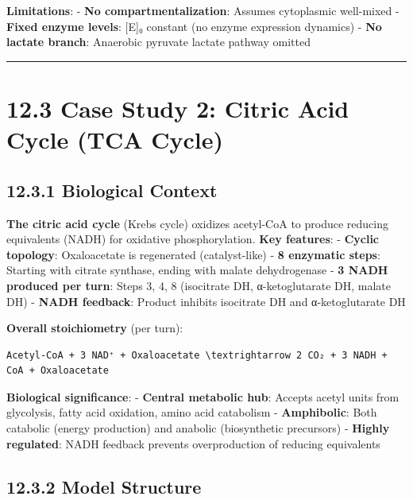 \textbf{Limitations}: - \textbf{No compartmentalization}: Assumes
cytoplasmic well-mixed - \textbf{Fixed enzyme levels}: {[}E{]}₀ constant
(no enzyme expression dynamics) - \textbf{No lactate branch}: Anaerobic
pyruvate \textrightarrow lactate pathway omitted

\begin{center}\rule{0.5\linewidth}{0.5pt}\end{center}

\hypertarget{case-study-2-citric-acid-cycle-tca-cycle}{%
\section{12.3 Case Study 2: Citric Acid Cycle (TCA
Cycle)}\label{case-study-2-citric-acid-cycle-tca-cycle}}

\hypertarget{biological-context-1}{%
\subsection{12.3.1 Biological Context}\label{biological-context-1}}

\textbf{The citric acid cycle} (Krebs cycle) oxidizes acetyl-CoA to
produce reducing equivalents (NADH) for oxidative phosphorylation.
\textbf{Key features}: - \textbf{Cyclic topology}: Oxaloacetate is
regenerated (catalyst-like) - \textbf{8 enzymatic steps}: Starting with
citrate synthase, ending with malate dehydrogenase - \textbf{3 NADH
produced per turn}: Steps 3, 4, 8 (isocitrate DH, α-ketoglutarate DH,
malate DH) - \textbf{NADH feedback}: Product inhibits isocitrate DH and
α-ketoglutarate DH

\textbf{Overall stoichiometry} (per turn):

\begin{lstlisting}
Acetyl-CoA + 3 NAD⁺ + Oxaloacetate \textrightarrow 2 CO₂ + 3 NADH + CoA + Oxaloacetate
\end{lstlisting}

\textbf{Biological significance}: - \textbf{Central metabolic hub}:
Accepts acetyl units from glycolysis, fatty acid oxidation, amino acid
catabolism - \textbf{Amphibolic}: Both catabolic (energy production) and
anabolic (biosynthetic precursors) - \textbf{Highly regulated}: NADH
feedback prevents overproduction of reducing equivalents

\hypertarget{model-structure-1}{%
\subsection{12.3.2 Model Structure}\label{model-structure-1}}

